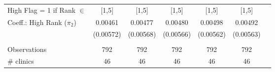 \begin{table}[htbp]
\begin{tabular}{lcccccr}
    High Flag = 1 if Rank $\in$ & [1,5] & [1,5] & [1,5] & [1,5] & [1,5] &  \\
    Coeff.: High Rank ($\pi_2$) & 0.00461 & 0.00477 & 0.00480 & 0.00498 & 0.00492 &  \\
          & (0.00572) & (0.00568) & (0.00566) & (0.00562) & (0.00563) &  \\
          &       &       &       &       &       &  \\
    Observations & 792   & 792   & 792   & 792   & 792   &  \\
    \# clinics & 46    & 46    & 46    & 46    & 46    &  \\
    \end{tabular}%
  \label{tab:addlabel}%
\end{table}%
